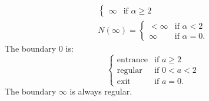 \documentclass[12pt]{report}
\begin{document}
\begin{itemize}
\begin{equation*}
\begin{array}{l}
\begin{cases}
				\infty&\text{if }\alpha\geq 2
			\end{cases}\\
			N(\infty)=\begin{cases}
				<\infty&\text{if }\alpha<2\\
				\infty&\text{if }\alpha=0.
			\end{cases}
		\end{array}
	\end{equation*}
	The boundary 0 is:
	\begin{equation*}
		\begin{cases}
			\text{entrance}&\text{if }a\geq2\\
			\text{regular}&\text{if }0<a<2\\
			\text{exit}&\text{if }a=0.
		\end{cases}
	\end{equation*}
	The boundary $\infty$ is always regular.
\end{itemize}
\end{document}
